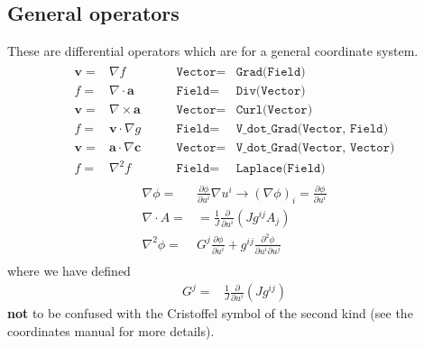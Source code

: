 \documentclass[12pt]{article}
\newcommand{\code}[1]{\texttt{#1}}
\def\L{\left}
\def\R{\right}
\def\Rarrow{\rightarrow}
\newcommand{\deriv}[2]{\ensuremath{\frac{\partial #1}{\partial #2}}}
\begin{document}
\subsection{General operators}
%
These are differential operators which are for a general coordinate system.
%
\begin{align}
%
\begin{array}{rclrcl}
\mathbf{v} =& \nabla f &\qquad \code{Vector} =& \code{Grad(Field)} \\
f =& \nabla\cdot\mathbf{a} &\qquad \code{Field} =& \code{Div(Vector)} \\
\mathbf{v} =& \nabla\times\mathbf{a} &\qquad \code{Vector} =&
\code{Curl(Vector)} \\
f =& \mathbf{v}\cdot\nabla g &\qquad \code{Field} =& \code{V\_dot\_Grad(Vector,
Field)} \\
\mathbf{v} =& \mathbf{a}\cdot\nabla\mathbf{c} &\qquad \code{Vector} =&
\code{V\_dot\_Grad(Vector, Vector)} \\
f =& \nabla^2 f &\qquad \code{Field} =& \code{Laplace(Field)}
\end{array}
%
\end{align}
%
\begin{align*}
\nabla\phi =& \deriv{\phi}{u^i}\nabla u^i \Rarrow \L(\nabla\phi\R)_i
    = \deriv{\phi}{u^i} \\ \nabla\cdot A =& =
    \frac{1}{J}\deriv{}{u^i}\L(Jg^{ij}A_j\R) \\ \nabla^2\phi =&
    G^j\deriv{\phi}{u^i} + g^{ij}\frac{\partial^2\phi}{\partial
    u^i\partial u^j} \\
\end{align*}
%
where we have defined
%
\begin{align*}
G^j =& \frac{1}{J}\deriv{}{u^i}\L(Jg^{ij}\R)
\end{align*}
%
\textbf{not} to be confused with the Cristoffel symbol of the second kind (see
the coordinates manual for more details).
%
\end{document}
